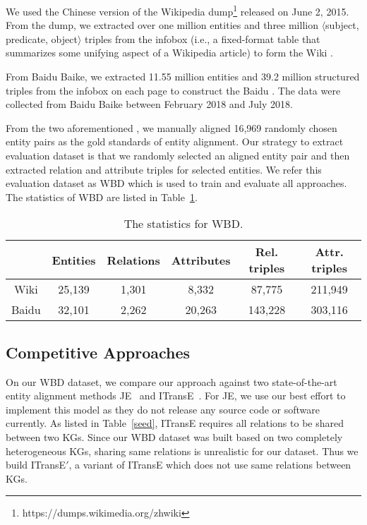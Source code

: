 	We used the Chinese version of the Wikipedia dump\footnote{https://dumps.wikimedia.org/zhwiki} released on June 2, 2015.
    From the dump, we extracted over one million entities and three million $\langle$subject, predicate, object$\rangle$ triples from the infobox (i.e., a fixed-format table that summarizes some unifying aspect of a Wikipedia article) to form the Wiki \KG.
	
	 From Baidu Baike, we extracted 11.55 million entities and 39.2 million structured triples from the infobox on each page to construct the Baidu \KG. 
	The data were collected from Baidu Baike between February 2018 and July 2018.

	
	 From the two aforementioned \KGs, we manually aligned 16,969 randomly chosen entity pairs as the gold standards of entity alignment. 
	Our strategy to extract evaluation dataset is that we randomly selected an aligned entity pair and then extracted relation and attribute triples for selected entities. 
	We refer this evaluation dataset as WBD which is used to train and evaluate all approaches. The statistics of WBD are listed in Table~\ref{dataset}.
	


	\begin{table}
	\centering
	\scriptsize
	\begin{tabular}{c|ccccc}
		\toprule
		&\bf  Entities &\bf  Relations &\bf  Attributes &\bf  Rel. triples &\bf  Attr. triples \\
		\midrule
		Wiki & 25,139 & 1,301 & 8,332 & 87,775 & 211,949 \\ 
		Baidu & 32,101 & 2,262 & 20,263 & 143,228 & 303,116 \\
		\bottomrule
	\end{tabular}
	\caption{The statistics for WBD.}
	\label{dataset}
\end{table}


	\subsection{Competitive Approaches}
	On our WBD dataset, we compare our approach against two state-of-the-art entity alignment methods JE~\cite{hao2016joint} and ITransE~\cite{zhu2017iterative}. For JE, we use our best effort to implement this model as they do not release any source code or software currently.  As listed in Table~\ref{seed}, ITransE requires all relations to be shared between two KGs. Since our WBD dataset was built based on two completely heterogeneous KGs, sharing same relations is unrealistic for our dataset. Thus we build ITransE$'$, a variant of ITransE which does not use same relations between KGs.
	
